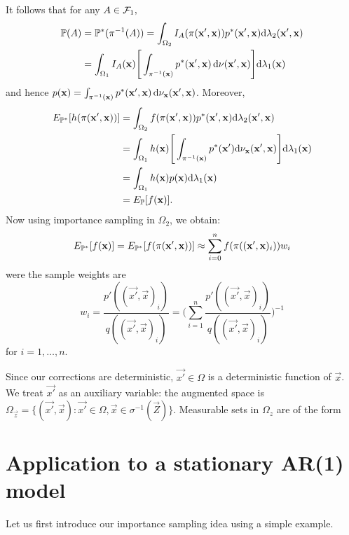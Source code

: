 It follows that for any $A \in \F_1,$
\begin{align*}
    \P(A) &= \P^*(\pi^{-1}(A)) = \int_{\Omega_2} I_A(\pi(\vec{x', \vec{x}}))p^*(\vec{x', \vec{x}})\D \lambda_2(\vec{x', \vec{x}}) \\
    &= \int_{\Omega_1} I_A(\vec{x})\Bigg[\int_{\pi^{-1}(\vec{x})}p^*(\vec{x', \vec{x}})\d \nu(\vec{x', \vec{x}}) \Bigg] \D \lambda_1(\vec{x})
\end{align*}
and hence $p(\vec{x}) = \int_{\pi^{-1}(\vec{x})}p^*(\vec{x',\vec{x}})\d \nu_{\vec{x}}(\vec{x', \vec{x}})$. Moreover,
\begin{align*}
    E_{\P^*}[h(\pi(\vec{x', \vec{x}}))] &= \int_{\Omega_2}f(\pi(\vec{x', \vec{x}}))p^*(\vec{x', \vec{x}})\D \lambda_2(\vec{x', \vec{x}})\\
    &= \int_{\Omega_1} h(\vec{x}) \Bigg[ \int_{\pi^{-1}(\vec{x})} p^*(\vec{x'}) \D \nu_{\vec{x}}(\vec{x', \vec{x}}) \Bigg] \D \lambda_1 (\vec{x})\\
    &= \int_{\Omega_1} h(\vec{x}) p(\vec{x}) \D \lambda_1 (\vec{x}) \\
    &= E_{\P}[f(\vec{x})].
\end{align*}
Now using importance sampling in $\Omega_2$, we obtain:
\begin{equation*}
    E_{\P^*}[f(\vec{x})] = E_{\P^*}[f(\pi (\vec{x',\vec{x}}))] \approx \sum_{i=0}^{n} f(\pi ((\vec{x'}, \vec{x})_i)) w_i
\end{equation*}
were the sample weights are 
\begin{equation*}
    w_i = \frac{p'((\vec{x'}, \vec{x})_i)}{q((\vec{x'}, \vec{x})_i)} = \Bigg( \sum_{i=1}^n \frac{p'((\vec{x'}, \vec{x})_i)}{q((\vec{x'}, \vec{x})_i)} \Bigg)^{-1}
\end{equation*}
for $i = 1, \dots, n$.

Since our corrections are deterministic, $\vec{x'} \in \Omega$ is a deterministic function of $\vec{x}$. We treat $\vec{x'}$ as an auxiliary variable: the augmented space is $\Omega_{\vec{z}} = \{(\vec{x'}, \vec{x}) : \vec{x'} \in \Omega, \vec{x} \in \sigma^{-1}(\vec{Z}) \} $. Measurable sets in $\Omega_z$ are of the form {}






\section{Application to a stationary AR(1) model}

Let us first introduce our importance sampling idea using a simple example.

